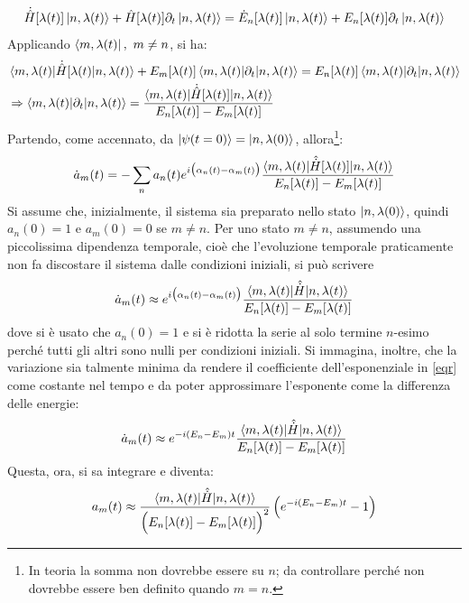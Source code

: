 \documentclass[11pt, a4paper]{scrartcl} %
\numberwithin{equation}{subsection}
\theoremstyle{style2}
\theoremstyle{style1}
\begin{document}
\[
	\dot{\hat{H}}[\lambda (t)]\ket{n,\lambda (t)} + \hat{H}[\lambda (t)] \partial _t \ket{n, \lambda (t)}  = \dot{E}_n [\lambda (t)] \ket{n, \lambda (t)} + E_n [\lambda (t)] \partial _t \ket{n,\lambda (t)} 
\] 
Applicando $\bra{m, \lambda (t)} , \ m\neq n$, si ha: 
\[
	\begin{split}
		&\braket{m, \lambda (t)|\dot{\hat{H}}[\lambda (t)|n , \lambda (t)}  + E_m[\lambda (t)] \braket{m, \lambda (t)|\partial _t|n,\lambda (t)} = E_n [\lambda (t)] \braket{m ,\lambda (t)|\partial _t|n , \lambda (t)} \\
		&\Rightarrow \braket{m , \lambda (t)|\partial _t|n , \lambda (t)} = \frac{\braket{m , \lambda (t)|\dot{\hat{H}}[\lambda (t)]|n,\lambda (t)} }{E_n[\lambda (t)] - E_m [\lambda (t)]}
	\end{split}
\] 
Partendo, come accennato, da $\ket{\psi (t=0)} = \ket{n,\lambda (0)} $, allora\footnote{\color{red} In teoria la somma non dovrebbe essere su $n$; da controllare perch\'e non dovrebbe essere ben definito quando $m = n$.}:
\begin{equation}
	\dot{a}_m(t) = -\sum_{n}^{} a_n(t) e^{i \big(\alpha _n(t) - \alpha _m(t)\big)} \frac{\braket{m,\lambda (t)|\hat{\dot{H}}[\lambda (t)]|n,\lambda (t)} }{E_n[\lambda (t)]- E_m[\lambda (t)]}
\end{equation}
Si assume che, inizialmente, il sistema sia preparato nello stato $\ket{n, \lambda (0)} $, quindi $a_n(0) = 1$ e $a_m(0) = 0 $ se $m\neq n$.
Per uno stato $m\neq n$, assumendo una piccolissima dipendenza temporale, cio\`e che l'evoluzione temporale praticamente non fa discostare il sistema dalle condizioni iniziali, si pu\`o scrivere
\begin{equation}\label{eqr}
	\dot{a}_m(t) \approx  e^{i \big(\alpha _n(t) - \alpha _m(t)\big)} \frac{\braket{m , \lambda (t)|\hat{\dot{H}}|n,\lambda (t)} }{E_n[\lambda (t)] - E_m[\lambda (t)]}
\end{equation}
dove si \`e usato che $a_n(0) = 1$ e si \`e ridotta la serie al solo termine $n$-esimo perch\'e tutti gli altri sono nulli per condizioni iniziali.
Si immagina, inoltre, che la variazione sia talmente minima da rendere il coefficiente dell'esponenziale in \ref{eqr} come costante nel tempo e da poter approssimare l'esponente come la differenza delle energie:
\begin{equation}
	\dot{a}_m(t) \approx e^{-i (E_n - E_m)t} \frac{\braket{m , \lambda (t)|\hat{\dot{H}}|n,\lambda (t)} }{E_n[\lambda (t)] - E_m[\lambda (t)]}
\end{equation}
Questa, ora, si sa integrare e diventa:
\begin{equation}
	a_m(t) \approx \frac{\braket{m , \lambda (t)|\hat{\dot{H}}|n,\lambda (t)} }{\Big(E_n[\lambda (t)] - E_m[\lambda (t)]\Big) ^2}\left(e^{-i(E_n - E_m) t} -1\right)  
\end{equation}
\end{document}
